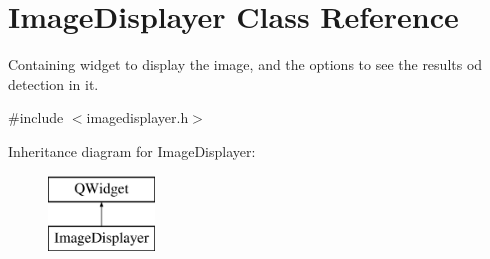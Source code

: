 \hypertarget{class_image_displayer}{}\section{Image\+Displayer Class Reference}
\label{class_image_displayer}


Containing widget to display the image, and the options to see the results od detection in it.  




{\ttfamily \#include $<$imagedisplayer.\+h$>$}

Inheritance diagram for Image\+Displayer\+:\begin{figure}[H]
\begin{center}
\leavevmode
\includegraphics[height=2.000000cm]{class_image_displayer}
\end{center}
\end{figure}
